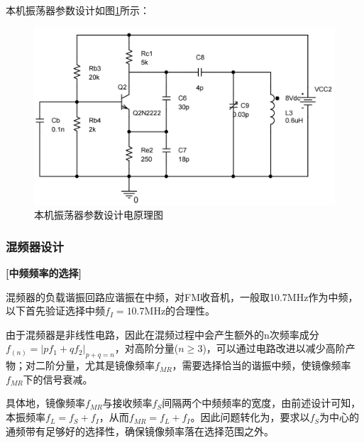 \documentclass[a4paper,12pt,twoside]{article}
\begin{document}
本机振荡器参数设计如图\ref{本振参数}所示：
\begin{figure}[H]
    \centering
    \includegraphics[scale=0.125]{本振电路sch已调参.png}
    \caption{本机振荡器参数设计电原理图}
    \label{本振参数}
\end{figure}

\subsubsection{混频器设计}
\textbf{[中频频率的选择]}

混频器的负载谐振回路应谐振在中频，对FM收音机，一般取10.7MHz作为中频，以下首先验证选择中频$f_{I}=10.7\mathrm{MHz}$的合理性。

由于混频器是非线性电路，因此在混频过程中会产生额外的n次频率成分$f_{(n)}=|pf_{1}+qf_2|_{p+q=n}$，对高阶分量($n\ge 3$)，可以通过电路改进以减少高阶产物；对二阶分量，尤其是镜像频率$f_{MR}$，需要选择恰当的谐振中频，使镜像频率$f_{MR}$下的信号衰减。

具体地，镜像频率$f_{MR}$与接收频率$f_{S}$间隔两个中频频率的宽度，由前述设计可知，本振频率$f_{L}=f_{S}+f_{I}$，从而$f_{MR}=f_{L}+f_{I}$。因此问题转化为，要求以$f_{S}$为中心的通频带有足够好的选择性，确保镜像频率落在选择范围之外。
\end{document}

